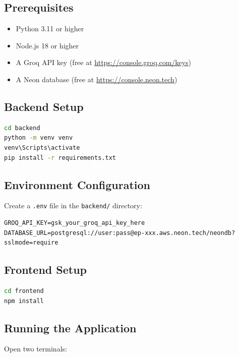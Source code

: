 \documentclass[12pt,a4paper]{article}
\begin{document}
\subsection{Prerequisites}
\begin{itemize}
    \item Python 3.11 or higher
    \item Node.js 18 or higher
    \item A Groq API key (free at \url{https://console.groq.com/keys})
    \item A Neon database (free at \url{https://console.neon.tech})
\end{itemize}

\subsection{Backend Setup}

\begin{lstlisting}[language=bash, caption=Backend Installation]
cd backend
python -m venv venv
venv\Scripts\activate
pip install -r requirements.txt
\end{lstlisting}

\subsection{Environment Configuration}

Create a \texttt{.env} file in the \texttt{backend/} directory:

\begin{lstlisting}[caption=Environment Variables]
GROQ_API_KEY=gsk_your_groq_api_key_here
DATABASE_URL=postgresql://user:pass@ep-xxx.aws.neon.tech/neondb?sslmode=require
\end{lstlisting}

\subsection{Frontend Setup}

\begin{lstlisting}[language=bash, caption=Frontend Installation]
cd frontend
npm install
\end{lstlisting}

\subsection{Running the Application}

Open two terminals:
\end{document}
